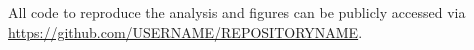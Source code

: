 \documentclass[fleqn,usenatbib]{mnras}
\begin{document}
All code to reproduce the analysis and figures can be publicly accessed via \url{https://github.com/USERNAME/REPOSITORYNAME}.







\bsp	%
\label{lastpage}
\end{document}
